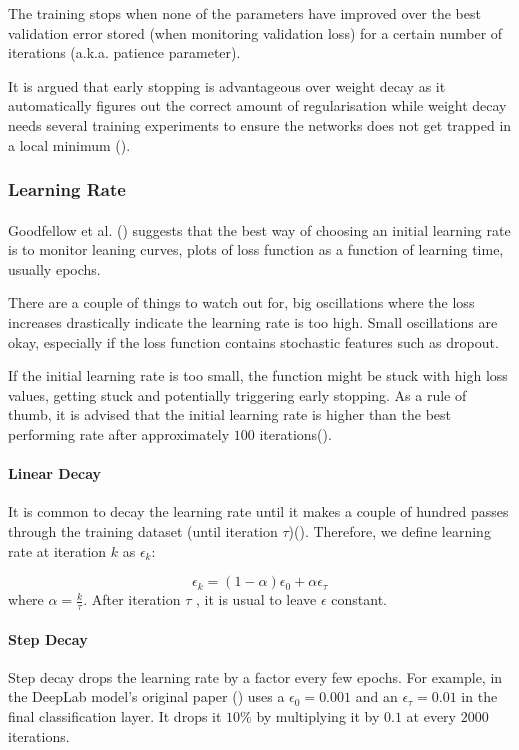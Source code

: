 The training stops when none of the parameters have improved over the best validation error stored (when monitoring validation loss) for a certain number of iterations (\gls{a.k.a.} patience parameter).

It is argued that early stopping is advantageous over weight decay as it automatically figures out the correct amount of regularisation while weight decay needs several training experiments to ensure the networks does not get trapped in a local minimum (\cite{GoodBengCour16}). 

\subsubsection{Learning Rate} \label{learning_rate}
\paragraph{}
Goodfellow et al. (\cite{GoodBengCour16}) suggests that the best way of choosing an initial learning rate is to monitor leaning curves, plots of loss function as a function of learning time, usually epochs. 

There are a couple of things to watch out for, big oscillations where the loss increases drastically indicate the learning rate is too high. Small oscillations are okay, especially if the loss function contains stochastic features such as dropout. 

If the initial learning rate is too small, the function might be stuck with high loss values, getting stuck and potentially triggering early stopping. As a rule of thumb, it is advised that the initial learning rate is higher than the best performing rate after approximately $100$ iterations(\cite{GoodBengCour16}).
\paragraph{Linear Decay} 
It is common to decay the learning rate until it makes a couple of hundred passes through the training dataset (until iteration $\tau$)(\cite{GoodBengCour16}). Therefore, we define learning rate at iteration $k$ as $\epsilon_k$:

\begin{equation} \label{eq_linear_lr}
\epsilon_k = (1 - \alpha)\epsilon_0 + \alpha\epsilon_\tau
\end{equation}
where $\alpha=\frac{k}{\tau}$. After iteration $\tau$ , it is usual to leave $\epsilon$ constant.
\paragraph{Step Decay} 
Step decay drops the learning rate by a factor every few epochs. For example, in the DeepLab model's original paper (\cite{chen2017deeplab}) uses a $\epsilon_0=0.001$ and an $\epsilon_\tau=0.01$ in the final classification layer. It drops it $10\%$ by multiplying it by $0.1$ at every $2000$ iterations.
